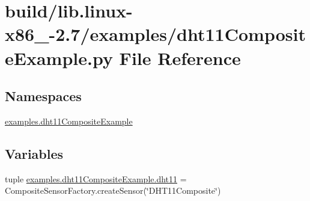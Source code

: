 \hypertarget{build_2lib_8linux-x86__64-2_87_2examples_2dht11CompositeExample_8py}{}\section{build/lib.linux-\/x86\+\_-\/2.7/examples/dht11\+Composite\+Example.py File Reference}
\label{build_2lib_8linux-x86__64-2_87_2examples_2dht11CompositeExample_8py}
\subsection*{Namespaces}
\begin{DoxyCompactItemize}
\item 
 \hyperlink{namespaceexamples_1_1dht11CompositeExample}{examples.\+dht11\+Composite\+Example}
\end{DoxyCompactItemize}
\subsection*{Variables}
\begin{DoxyCompactItemize}
\item 
tuple \hyperlink{namespaceexamples_1_1dht11CompositeExample_a6868e070252e239f73cce9f8a157ce43}{examples.\+dht11\+Composite\+Example.\+dht11} = Composite\+Sensor\+Factory.\+create\+Sensor(\char`\"{}D\+H\+T11\+Composite\char`\"{})
\end{DoxyCompactItemize}
